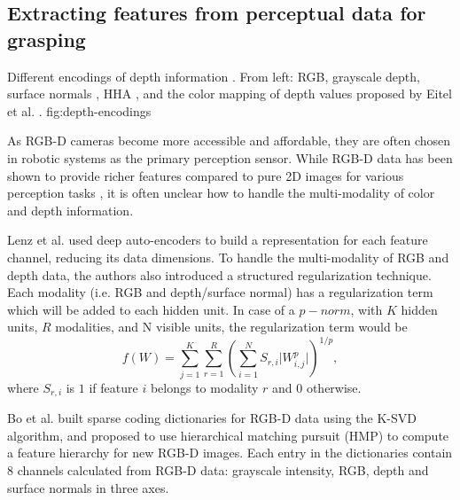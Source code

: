 \subsection{Extracting features from perceptual data for grasping}
             {Different encodings of depth information \cite{Eitel2015}. From left: RGB, grayscale depth, surface
                 normals \cite{Bo2013}, HHA \cite{Gupta2014RGBDFeatures}, and the color mapping of depth values proposed
                 by Eitel et al. \cite{Eitel2015}.}
             {fig:depth-encodings}{\linewidth}

As RGB-D cameras become more accessible and affordable, they are often chosen in robotic systems as the primary
perception sensor. While RGB-D data has been shown to provide richer features compared to pure 2D images for various
perception tasks \cite{lenz2015,Eitel2015,Gupta2014RGBDFeatures,jiang2011}, it is often unclear how to handle the
multi-modality of color and depth information.

Lenz et al. \cite{lenz2015} used deep auto-encoders to build a representation for each feature channel, reducing its data
dimensions. To handle the multi-modality of RGB and depth data, the authors also introduced a structured regularization
technique. Each modality (i.e. RGB and depth/surface normal) has a regularization term which will be added to each
hidden unit. In case of a $p-norm$, with $K$ hidden units, $R$ modalities, and N visible units, the regularization term
would be
\[f(W) = \sum\limits^K_{j=1} \sum\limits^R_{r=1} \left( \sum\limits^N_{i=1} S_{r,i} \lvert W^p_{i,j} \rvert \right)
^{1/p}, \]
where $S_{r,i}$ is $1$ if feature $i$ belongs to modality $r$ and $0$ otherwise.

Bo et al. \cite{Bo2013} built sparse coding dictionaries for RGB-D data using the K-SVD algorithm, and proposed to use
hierarchical matching pursuit (HMP) to compute a feature hierarchy for new RGB-D images. Each entry in the dictionaries
contain 8 channels calculated from RGB-D data: grayscale intensity, RGB, depth and surface normals in three axes.

